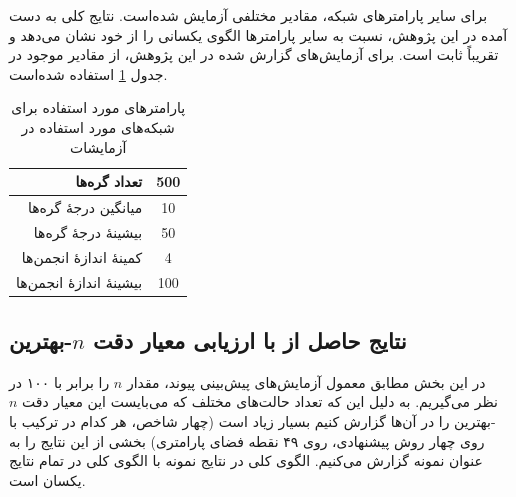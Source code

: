 برای سایر پارامترهای شبکه، مقادیر مختلفی آزمایش شده‌است. نتایج کلی به دست آمده در این پژوهش، نسبت به سایر پارامترها الگوی یکسانی را از خود نشان می‌دهد و تقریباً ثابت است. برای آزمایش‌های گزارش شده در این پژوهش، از مقادیر موجود در جدول \ref{tab:LFR_params} استفاده شده‌است.
\begin{table}
  \caption{پارامترهای مورد استفاده برای شبکه‌های  مورد استفاده در آزمایشات}
  \label{tab:LFR_params}

  \begin{center}
    \begin{tabular}{| r | c |}
      \hline
      تعداد گره‌ها & 500 \\
      \hline
      میانگین درجهٔ گره‌ها  &  10 \\
      \hline
      بیشینهٔ درجهٔ گره‌ها  &  50 \\
      \hline
      کمینهٔ اندازهٔ انجمن‌ها &   4 \\
      \hline
      بیشینهٔ اندازهٔ انجمن‌ها & 100 \\
      \hline
    \end{tabular}
  \end{center}
\end{table}

\subsection{نتایج حاصل از با ارزیابی معیار دقت $n$-بهترین}
در این بخش مطابق معمول آزمایش‌های پیش‌بینی پیوند، مقدار $n$ را برابر با ۱۰۰ در نظر می‌گیریم. به دلیل این که تعداد حالت‌های مختلف که می‌بایست این معیار دقت $n$-بهترین را در آن‌ها گزارش کنیم بسیار زیاد است (چهار شاخص، هر کدام در ترکیب با روی چهار روش پیشنهادی، روی ۴۹ نقطه فضای پارامتری) بخشی از این نتایج را به عنوان نمونه گزارش می‌کنیم. الگوی کلی در نتایج نمونه با الگوی کلی در تمام نتایج یکسان است.

